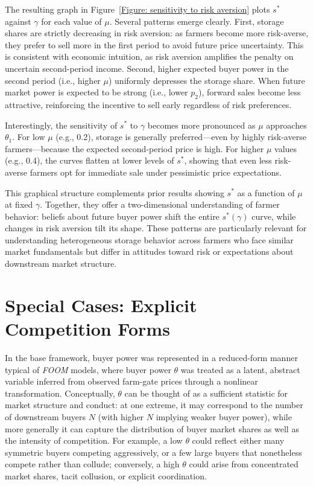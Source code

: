 The resulting graph in Figure~\ref{Figure: sensitivity to risk aversion} plots $s^*$ against $\gamma$ for each value of $\mu$. Several patterns emerge clearly. First, storage shares are strictly decreasing in risk aversion: as farmers become more risk-averse, they prefer to sell more in the first period to avoid future price uncertainty. This is consistent with economic intuition, as risk aversion amplifies the penalty on uncertain second-period income. Second, higher expected buyer power in the second period (i.e., higher $\mu$) uniformly depresses the storage share. When future market power is expected to be strong (i.e., lower $p_2$), forward sales become less attractive, reinforcing the incentive to sell early regardless of risk preferences.

Interestingly, the sensitivity of $s^*$ to $\gamma$ becomes more pronounced as $\mu$ approaches $\theta_1$. For low $\mu$ (e.g., 0.2), storage is generally preferred---even by highly risk-averse farmers---because the expected second-period price is high. For higher $\mu$ values (e.g., 0.4), the curves flatten at lower levels of $s^*$, showing that even less risk-averse farmers opt for immediate sale under pessimistic price expectations.

This graphical structure complements prior results showing $s^*$ as a function of $\mu$ at fixed $\gamma$. Together, they offer a two-dimensional understanding of farmer behavior: beliefs about future buyer power shift the entire $s^*(\gamma)$ curve, while changes in risk aversion tilt its shape. These patterns are particularly relevant for understanding heterogeneous storage behavior across farmers who face similar market fundamentals but differ in attitudes toward risk or expectations about downstream market structure.


\section{Special Cases: Explicit Competition Forms}\label{Section: Special Cases: Explicit Competition Forms}
\noindent In the base framework, buyer power was represented in a reduced-form manner typical of \textit{FOOM} models, where buyer power $\theta$ was treated as a latent, abstract variable inferred from observed farm-gate prices through a nonlinear transformation. Conceptually, $\theta$ can be thought of as a sufficient statistic for market structure and conduct: at one extreme, it may correspond to the number of downstream buyers $N$ (with higher $N$ implying weaker buyer power), while more generally it can capture the distribution of buyer market shares as well as the intensity of competition. For example, a low $\theta$ could reflect either many symmetric buyers competing aggressively, or a few large buyers that nonetheless compete rather than collude; conversely, a high $\theta$ could arise from concentrated market shares, tacit collusion, or explicit coordination. 

